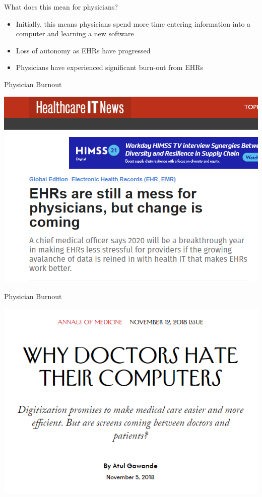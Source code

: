 \documentclass[10pt]{beamer}
\begin{document}
\begin{frame}[fragile]{What does this mean for physicians?}
\begin{itemize}
    \item Initially, this means physicians spend more time entering information into a computer and learning a new software
    \item Loss of autonomy as EHRs have progressed
    \item Physicians have experienced significant burn-out from EHRs
\end{itemize}

\end{frame}

\begin{frame}[noframenumbering]{Physician Burnout}
\begin{center}
    \includegraphics[scale=.4]{graphics/News Clip1.PNG}
\end{center}
\end{frame}

\begin{frame}[noframenumbering]{Physician Burnout}
\begin{center}
    \includegraphics[scale=.5]{graphics/News Clip2.PNG}
\end{center}
\end{frame}
\end{document}
